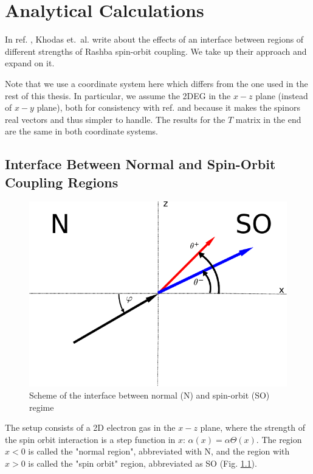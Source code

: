 \chapter{Analytical Calculations}
\label{sec:analytical}
\newcommand{\ta}{\ensuremath{\tilde \alpha}}
In ref. \cite{khodas}, Khodas et.~al. write about the effects of an
interface between regions of different strengths of Rashba spin-orbit
coupling. We take up their approach and expand on it.

Note that
we use a coordinate system here which differs from the one used in the
rest of this thesis. In particular, we assume the 2DEG in the $x-z$
plane (instead of $x-y$ plane), both for consistency with
ref. \cite{khodas} and because it makes the spinors real vectors and
thus simpler to handle. The results for the $T$ matrix in the end are
the same in both coordinate systems.

\section{Interface Between Normal and Spin-Orbit Coupling Regions}

\begin{figure}
    \begin{center}
        \includegraphics{setup-simple.pdf}
    \end{center}
    \caption{Scheme of the interface between normal (N)
            and spin-orbit (SO) regime}
    \label{fig:setup-zero}
\end{figure}

The setup consists of a 2D electron gas in the $x-z$ plane, where the
strength of the spin orbit interaction is a step function in $x$:
$\alpha(x) = \alpha \Theta(x)$. The region $x < 0$ is called the
"normal region", abbreviated with N, and the region with $x > 0$ is
called the "spin orbit" region, abbreviated as SO (Fig.
\ref{fig:setup-zero}).



